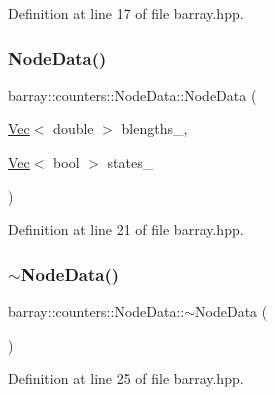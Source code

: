 Definition at line 17 of file barray.\+hpp.

\mbox{\label{classbarray_1_1counters_1_1_node_data_a3c0f645c13147a3dbe814de63db09088}} 
\subsubsection{\texorpdfstring{Node\+Data()}{NodeData()}\hspace{0.1cm}{\footnotesize\ttfamily [3/3]}}
{\footnotesize\ttfamily barray\+::counters\+::\+Node\+Data\+::\+Node\+Data (\begin{DoxyParamCaption}\item[{\hyperlink{namespacebarray_1_1counters_a7899949c19d9915ddc164b59004adbd2}{Vec}$<$ double $>$}]{blengths\+\_\+,  }\item[{\hyperlink{namespacebarray_1_1counters_a7899949c19d9915ddc164b59004adbd2}{Vec}$<$ bool $>$}]{states\+\_\+ }\end{DoxyParamCaption})\hspace{0.3cm}{\ttfamily [inline]}}



Definition at line 21 of file barray.\+hpp.

\mbox{\label{classbarray_1_1counters_1_1_node_data_ae30fb305999dee1477210365e8c2f585}} 
\subsubsection{\texorpdfstring{$\sim$\+Node\+Data()}{~NodeData()}}
{\footnotesize\ttfamily barray\+::counters\+::\+Node\+Data\+::$\sim$\+Node\+Data (\begin{DoxyParamCaption}{ }\end{DoxyParamCaption})\hspace{0.3cm}{\ttfamily [inline]}}



Definition at line 25 of file barray.\+hpp.



